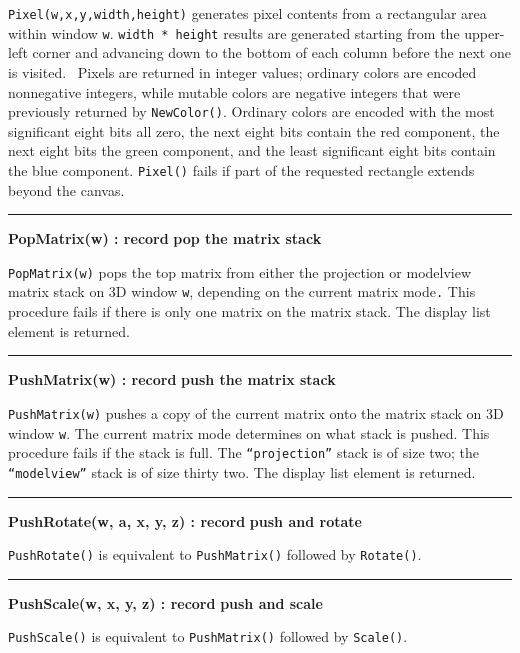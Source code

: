 \noindent
\texttt{Pixel(w,x,y,width,height)} generates pixel contents from a
rectangular area within window \texttt{w}. \texttt{width * height}
results are generated starting from the upper-left corner and advancing
down to the bottom of each column before the next one is visited.
\ Pixels are returned in integer values; ordinary colors are encoded
nonnegative integers, while mutable colors are negative integers that
were previously returned by \texttt{NewColor()}. Ordinary colors are
encoded with the most significant eight bits all zero, the next eight
bits contain the red component, the next eight bits the green
component, and the least significant eight bits contain the blue
component. \texttt{Pixel()} fails if part of the requested rectangle
extends beyond the canvas.

\bigskip\hrule\vspace{0.1cm}
\noindent
{\bf PopMatrix(w) : record } \hfill {\bf pop the matrix stack}

\noindent
\texttt{PopMatrix(w)} pops the top matrix from either the projection or
modelview matrix stack on 3D window \texttt{w}, depending on the
current matrix mode\texttt{.} This procedure fails if there is only one
matrix on the matrix stack. The display list element is returned. 

\bigskip\hrule\vspace{0.1cm}
\noindent
{\bf PushMatrix(w) : record } \hfill {\bf push the matrix stack}

\noindent
\texttt{PushMatrix(w)} pushes a copy of the current matrix onto the
matrix stack on 3D window \texttt{w}. The current matrix mode
determines on what stack is pushed. This procedure fails if the stack
is full. The \texttt{{\textquotedblleft}projection{\textquotedblright}}
stack is of size two; the
\texttt{{\textquotedblleft}modelview{\textquotedblright}} stack is of
size thirty two. The display list element is returned.

\bigskip\hrule\vspace{0.1cm}
\noindent
{\bf PushRotate(w, a, x, y, z) : record } \hfill {\bf push and rotate}

\noindent
\texttt{PushRotate()} is equivalent to \texttt{PushMatrix()} followed by
\texttt{Rotate()}.

\bigskip\hrule\vspace{0.1cm}
\noindent
{\bf PushScale(w, x, y, z) : record } \hfill {\bf push and scale}

\noindent
\texttt{PushScale()} is equivalent to \texttt{PushMatrix()} followed
by \texttt{Scale()}.

